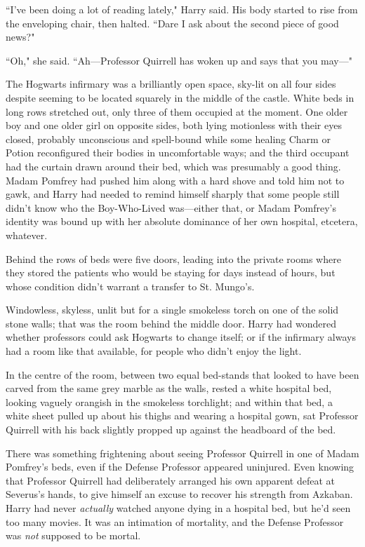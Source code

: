 ``I've been doing a lot of reading lately," Harry said. His body started to rise from the enveloping chair, then halted. ``Dare I ask about the second piece of good news?"

``Oh," she said. ``Ah---Professor Quirrell has woken up and says that you may---"

\later

The Hogwarts infirmary was a brilliantly open space, sky-lit on all four sides despite seeming to be located squarely in the middle of the castle. White beds in long rows stretched out, only three of them occupied at the moment. One older boy and one older girl on opposite sides, both lying motionless with their eyes closed, probably unconscious and spell-bound while some healing Charm or Potion reconfigured their bodies in uncomfortable ways; and the third occupant had the curtain drawn around their bed, which was presumably a good thing. Madam Pomfrey had pushed him along with a hard shove and told him not to gawk, and Harry had needed to remind himself sharply that some people still didn't know who the Boy-Who-Lived was---either that, or Madam Pomfrey's identity was bound up with her absolute dominance of her own hospital, etcetera, whatever.

Behind the rows of beds were five doors, leading into the private rooms where they stored the patients who would be staying for days instead of hours, but whose condition didn't warrant a transfer to St. Mungo's.

Windowless, skyless, unlit but for a single smokeless torch on one of the solid stone walls; that was the room behind the middle door. Harry had wondered whether professors could ask Hogwarts to change itself; or if the infirmary always had a room like that available, for people who didn't enjoy the light.

In the centre of the room, between two equal bed-stands that looked to have been carved from the same grey marble as the walls, rested a white hospital bed, looking vaguely orangish in the smokeless torchlight; and within that bed, a white sheet pulled up about his thighs and wearing a hospital gown, sat Professor Quirrell with his back slightly propped up against the headboard of the bed.

There was something frightening about seeing Professor Quirrell in one of Madam Pomfrey's beds, even if the Defense Professor appeared uninjured. Even knowing that Professor Quirrell had deliberately arranged his own apparent defeat at Severus's hands, to give himself an excuse to recover his strength from Azkaban. Harry had never \emph{actually} watched anyone dying in a hospital bed, but he'd seen too many movies. It was an intimation of mortality, and the Defense Professor was \emph{not} supposed to be mortal.

